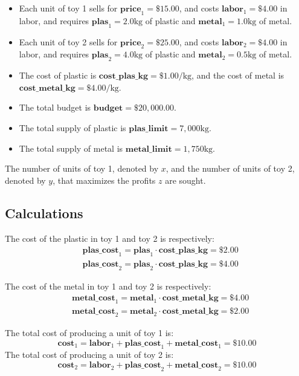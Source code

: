 \documentclass{article}
\begin{document}
\begin{itemize}
\item Each unit of toy 1 sells for \(\textbf{price}_1 = \$15.00\), and costs \(\textbf{labor}_1 = \$4.00\) in labor, and requires \(\textbf{plas}_1 = 2.0\text{kg}\) of plastic and \(\textbf{metal}_1 = 1.0\text{kg}\) of metal. 
\item Each unit of toy 2 sells for \(\textbf{price}_2 = \$25.00\), and costs \(\textbf{labor}_2 = \$4.00\) in labor, and requires \(\textbf{plas}_2 = 4.0\text{kg}\) of plastic and \(\textbf{metal}_2 = 0.5\text{kg}\) of metal. 
\item The cost of plastic is \(\textbf{cost\_plas\_kg} = \$1.00/\text{kg}\), and the cost of metal is \(\textbf{cost\_metal\_kg} = \$4.00/\text{kg}\). 
\item The total budget is \(\textbf{budget} = \$20,\!000.00\). 
\item The total supply of plastic is \(\textbf{plas\_limit} = 7,\!000\text{kg}\). 
\item The total supply of metal is \(\textbf{metal\_limit} = 1,\!750\text{kg}\). 
\end{itemize}

The number of units of toy 1, denoted by \(x\), and the number of units of toy 2, denoted by \(y\), that maximizes the profits \(z\) are sought.


\subsection*{Calculations}

The cost of the plastic in toy 1 and toy 2 is respectively:
\begin{align*}
& \textbf{plas\_cost}_1 = \textbf{plas}_1 \cdot \textbf{cost\_plas\_kg} = \$2.00 \\
& \textbf{plas\_cost}_2 = \textbf{plas}_2 \cdot \textbf{cost\_plas\_kg} = \$4.00
\end{align*}

The cost of the metal in toy 1 and toy 2 is respectively:
\begin{align*}
& \textbf{metal\_cost}_1 = \textbf{metal}_1 \cdot \textbf{cost\_metal\_kg} = \$4.00 \\
& \textbf{metal\_cost}_2 = \textbf{metal}_2 \cdot \textbf{cost\_metal\_kg} = \$2.00
\end{align*}

The total cost of producing a unit of toy 1 is:
\[\textbf{cost}_1 = \textbf{labor}_1 + \textbf{plas\_cost}_1 + \textbf{metal\_cost}_1 = \$10.00\]
The total cost of producing a unit of toy 2 is:
\[\textbf{cost}_2 = \textbf{labor}_2 + \textbf{plas\_cost}_2 + \textbf{metal\_cost}_2 = \$10.00\]
\end{document}
